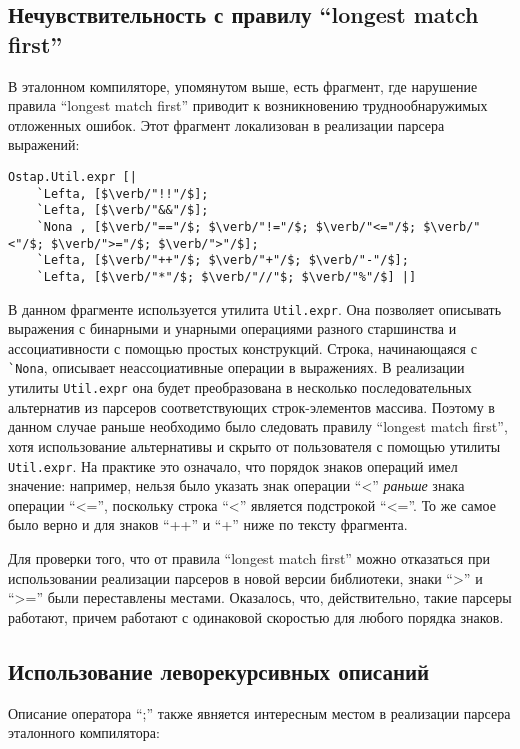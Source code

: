 \documentclass[conference]{IEEEtran}
\begin{document}
\subsection{Нечувствительность с правилу ``longest match first''}

В эталонном компиляторе, упомянутом выше, есть фрагмент, где нарушение правила ``longest match first'' приводит к возникновению труднообнаружимых отложенных ошибок.
Этот фрагмент локализован в реализации парсера выражений:

\begin{lstlisting}[basicstyle=\small]
  Ostap.Util.expr [|
    `Lefta, [$\verb/"!!"/$];
    `Lefta, [$\verb/"&&"/$];
    `Nona , [$\verb/"=="/$; $\verb/"!="/$; $\verb/"<="/$; $\verb/"<"/$; $\verb/">="/$; $\verb/">"/$];
    `Lefta, [$\verb/"++"/$; $\verb/"+"/$; $\verb/"-"/$];
    `Lefta, [$\verb/"*"/$; $\verb/"//"$; $\verb/"%"/$] |]
\end{lstlisting}

В данном фрагменте используется утилита \lstinline|Util.expr|. Она позволяет описывать выражения
с бинарными и унарными операциями разного старшинства и ассоциативности с помощью простых конструкций. Строка, начинающаяся с \lstinline|`Nona|, описывает неассоциативные
операции в выражениях. В реализации утилиты \lstinline|Util.expr| она будет преобразована в несколько последовательных альтернатив из парсеров соответствующих
строк-элементов массива. Поэтому в данном случае раньше необходимо было следовать правилу ``longest match first'', хотя использование альтернативы и скрыто от пользователя
с помощью утилиты \lstinline|Util.expr|. На практике это означало, что порядок знаков операций имел значение: например, нельзя было указать знак операции ``<'' \emph{раньше}
знака операции ``<='', поскольку строка ``<'' является подстрокой ``<=''. То же самое было верно и для знаков ``++'' и ``+'' ниже по тексту фрагмента.

Для проверки того, что от правила ``longest match first'' можно отказаться при использовании реализации парсеров в новой версии библиотеки, знаки ``>'' и ``>='' были
переставлены местами. Оказалось, что, действительно, такие парсеры работают, причем работают с одинаковой скоростью для любого порядка знаков.

\subsection{Использование леворекурсивных описаний}

Описание оператора ``;'' также явняется интересным местом в реализации парсера эталонного компилятора:
\end{document}
